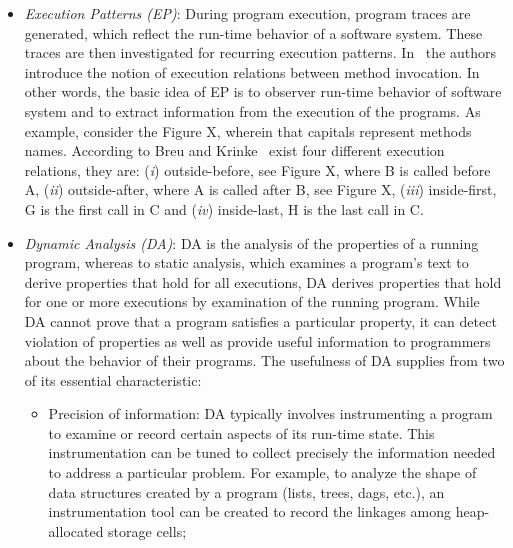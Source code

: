 \begin{itemize}

\item \textit{Execution Patterns (EP)}: During program execution, program traces are generated, which reflect the run-time behavior of a software system. These traces are then investigated for recurring execution patterns. In~\cite{Breu:2004:AMU:1025115.1025235} the authors introduce the notion of execution relations between method invocation. In other words, the basic idea of EP is to observer run-time behavior of software system and to extract information from the execution of the programs. As example, consider the Figure X, wherein that capitals represent methods names. According to Breu and Krinke~\cite{Breu:2004:AMU:1025115.1025235} exist four different execution relations, they are: (\textit{i}) outside-before, see Figure X, where B is called before A, (\textit{ii}) outside-after, where A is called after B, see Figure X, (\textit{iii}) inside-first, G is the first call in C and (\textit{iv}) inside-last, H is the last call in C. 



\item \textit{Dynamic Analysis (DA)}: DA is the analysis of the properties of a running program, whereas to static analysis, which examines a program's text to derive properties that hold for all executions, DA derives properties that hold for one or more executions by examination of the running program. 
While DA cannot prove that a program satisfies a particular property, it can detect violation of properties as well as provide useful information to programmers about the behavior of their programs. 
The usefulness of DA supplies from two of its essential characteristic:
\begin{itemize}

\item Precision of information: DA typically involves instrumenting a program to examine or record certain aspects of its run-time state. This instrumentation can be tuned to collect precisely the information needed to address a particular problem. For example, to analyze the shape of data structures created by a program (lists, trees, dags, etc.), an instrumentation tool can be created to record the linkages among heap-allocated storage cells;


\end{itemize}
\end{itemize}
